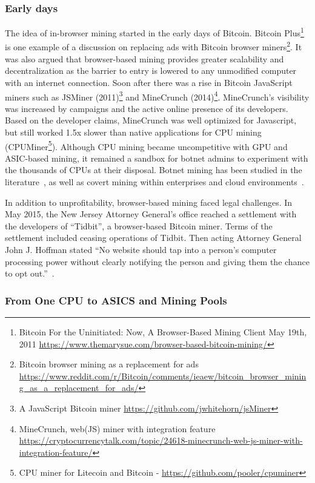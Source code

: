 \subsubsection{Early days}
The idea of in-browser mining started in the early days of Bitcoin. Bitcoin Plus\footnote{Bitcoin For the Uninitiated: Now, A Browser-Based Mining Client  May 19th, 2011 \url{https://www.themarysue.com/browser-based-bitcoin-mining/}} is one example of a discussion on replacing ads with Bitcoin browser miners\footnote{Bitcoin browser mining as a replacement for ads \url{https://www.reddit.com/r/Bitcoin/comments/ieaew/bitcoin_browser_mining_as_a_replacement_for_ads/}}. It was also argued that browser-based mining provides greater scalability and decentralization as the barrier to entry is lowered to any unmodified computer with an internet connection. Soon after there was a rise in Bitcoin JavaScript miners such as JSMiner (2011)\footnote{A JavaScript Bitcoin miner \url{https://github.com/jwhitehorn/jsMiner}} and MineCrunch (2014)\footnote{MineCrunch, web(JS) miner with integration feature \url{https://cryptocurrencytalk.com/topic/24618-minecrunch-web-js-miner-with-integration-feature/}}. MineCrunch's visibility was increased by campaigns and the active online presence of its developers. Based on the developer claims, MineCrunch was well optimized for Javascript, but still worked 1.5x slower than native applications for CPU mining (\eg CPUMiner\footnote{CPU miner for Litecoin and Bitcoin - \url{https://github.com/pooler/cpuminer}}). Although CPU mining became uncompetitive with GPU and ASIC-based mining, it remained a sandbox for botnet admins to experiment with the thousands of CPUs at their disposal. Botnet mining has been studied in the literature~\cite{huang2014botcoin,wyke2012zeroaccess}, as well as covert mining within enterprises and cloud environments~\cite{MiningonSOeDime2017}.

In addition to unprofitability, browser-based mining faced legal challenges. In May 2015, the New Jersey Attorney General's office reached a settlement with the developers of ``Tidbit'', a browser-based Bitcoin miner. Terms of the settlement included ceasing operations of Tidbit. Then acting Attorney General John J. Hoffman stated ``No website should tap into a person's computer processing power without clearly notifying the person and giving them the chance to opt out.''~\cite{njcourtbitcoinjsminer}.

\subsubsection{From One CPU to ASICS and Mining Pools} \label{sec:cryptojackingasic}


